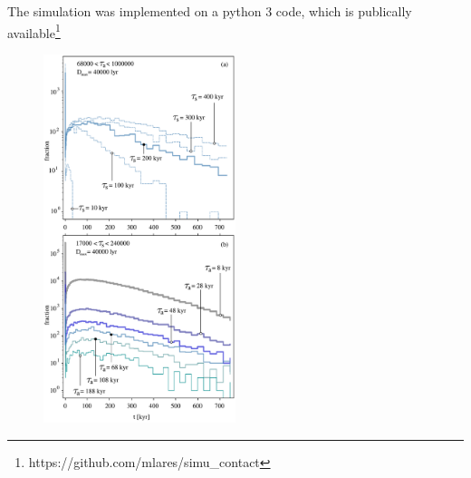 The simulation was implemented on a python 3 code, which is publically
available\footnote{https://github.com/mlares/simu\_contact}

                   
\begin{figure}
   \centering
   \includegraphics[width=0.5\textwidth]{waiting_s+a_dif_ylog.pdf}
   \label{F_waiting_for_1C}
\end{figure}

